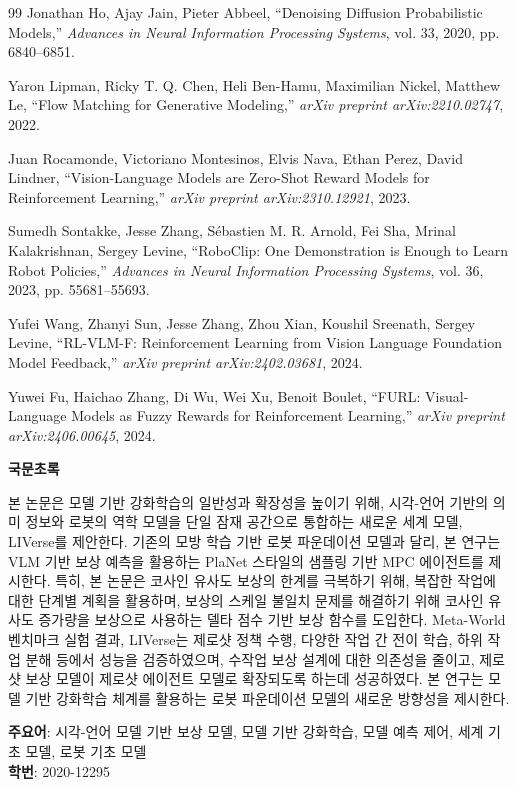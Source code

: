 \documentclass[11pt]{article}
\begin{document}
\begin{thebibliography}{99}
Jonathan Ho, Ajay Jain, Pieter Abbeel,
``Denoising Diffusion Probabilistic Models,''
\textit{Advances in Neural Information Processing Systems}, vol. 33, 2020, pp. 6840--6851.

Yaron Lipman, Ricky T. Q. Chen, Heli Ben-Hamu, Maximilian Nickel, Matthew Le,
``Flow Matching for Generative Modeling,''
\textit{arXiv preprint arXiv:2210.02747}, 2022.

Juan Rocamonde, Victoriano Montesinos, Elvis Nava, Ethan Perez, David Lindner,
``Vision-Language Models are Zero-Shot Reward Models for Reinforcement Learning,''
\textit{arXiv preprint arXiv:2310.12921}, 2023.

Sumedh Sontakke, Jesse Zhang, Sébastien M. R. Arnold, Fei Sha, Mrinal Kalakrishnan, Sergey Levine,
``RoboClip: One Demonstration is Enough to Learn Robot Policies,''
\textit{Advances in Neural Information Processing Systems}, vol. 36, 2023, pp. 55681--55693.

Yufei Wang, Zhanyi Sun, Jesse Zhang, Zhou Xian, Koushil Sreenath, Sergey Levine,
``RL-VLM-F: Reinforcement Learning from Vision Language Foundation Model Feedback,''
\textit{arXiv preprint arXiv:2402.03681}, 2024.

Yuwei Fu, Haichao Zhang, Di Wu, Wei Xu, Benoit Boulet,
``FURL: Visual-Language Models as Fuzzy Rewards for Reinforcement Learning,''
\textit{arXiv preprint arXiv:2406.00645}, 2024.

\end{thebibliography}


\clearpage
\begin{center}
\Large\textbf{국문초록}
\end{center}
\vspace{1cm}

본 논문은 모델 기반 강화학습의 일반성과 확장성을 높이기 위해, 시각-언어 기반의 의미 정보와 로봇의 역학 모델을 단일 잠재 공간으로 통합하는 새로운 세계 모델, LIVerse를 제안한다. 기존의 모방 학습 기반 로봇 파운데이션 모델과 달리, 본 연구는 VLM 기반 보상 예측을 활용하는 PlaNet 스타일의 샘플링 기반 MPC 에이전트를 제시한다. 특히, 본 논문은 코사인 유사도 보상의 한계를 극복하기 위해, 복잡한 작업에 대한 단계별 계획을 활용하며, 보상의 스케일 불일치 문제를 해결하기 위해 코사인 유사도 증가량을 보상으로 사용하는 델타 점수 기반 보상 함수를 도입한다. Meta-World 벤치마크 실험 결과, LIVerse는 제로샷 정책 수행, 다양한 작업 간 전이 학습, 하위 작업 분해 등에서 성능을 검증하였으며, 수작업 보상 설계에 대한 의존성을 줄이고, 제로샷 보상 모델이 제로샷 에이전트 모델로 확장되도록 하는데 성공하였다. 본 연구는 모델 기반 강화학습 체계를 활용하는 로봇 파운데이션 모델의 새로운 방향성을 제시한다.

\vspace{1cm}
\noindent\textbf{주요어}: 시각-언어 모델 기반 보상 모델, 모델 기반 강화학습, 모델 예측 제어, 세계 기초 모델, 로봇 기초 모델
\vspace{0.5cm}\\
\noindent\textbf{학번}: 2020-12295
\end{document}
